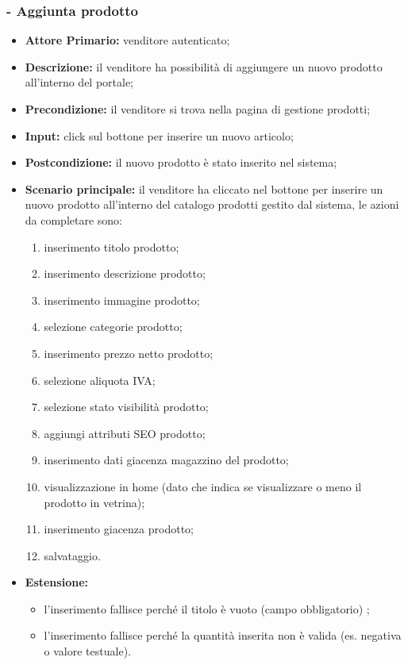 \subsubsection{- Aggiunta prodotto}
\begin{itemize}
    \item \textbf{Attore Primario:} venditore autenticato;
    \item \textbf{Descrizione:} il venditore ha possibilità di aggiungere un nuovo prodotto all’interno del portale;
    \item \textbf{Precondizione:} il venditore si trova nella pagina di gestione prodotti;
    \item \textbf{Input:} click sul bottone per inserire un nuovo articolo;
    \item \textbf{Postcondizione:} il nuovo prodotto è stato inserito nel sistema;
    \item \textbf{Scenario principale:} il venditore ha cliccato nel bottone per inserire un nuovo prodotto all’interno del catalogo prodotti gestito dal sistema, le azioni da completare sono: 
    \begin{enumerate}
        \item inserimento titolo prodotto;
        \item inserimento descrizione prodotto;
        \item inserimento immagine prodotto;
        \item selezione categorie prodotto;
        \item inserimento prezzo netto prodotto;
        \item selezione aliquota IVA;
        \item selezione stato visibilità prodotto; 
        \item aggiungi attributi SEO prodotto;
        \item inserimento dati giacenza magazzino del prodotto;
        \item visualizzazione in home (dato che indica se visualizzare o meno il prodotto in vetrina);
        \item inserimento giacenza prodotto;
        \item salvataggio.
    \end{enumerate}
    \item \textbf{Estensione:}
    \begin{itemize}
        \item l'inserimento fallisce perché il titolo è vuoto (campo obbligatorio) ;
        \item l'inserimento fallisce perché la quantità inserita non è valida (es. negativa o valore testuale).
    \end{itemize}
\end{itemize}

